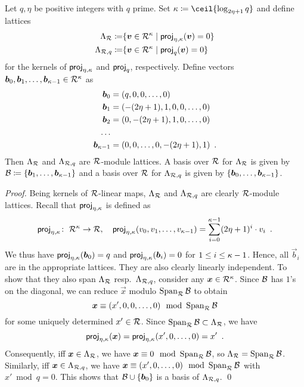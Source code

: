 \begin{proposition}\label{prop:kernellattices}
Let $q,\eta$ be positive integers with $q$ prime. Set $\limbs \coloneqq \ceil{ \log_{2\eta+1}q}$ and define lattices
\begin{align*}
\Lambda_{\mathcal{R}}    \coloneqq &\{\boldsymbol{v}\in\mathcal{R}^\kappa \mid \mathsf{proj}_{\eta,\kappa}(\boldsymbol{v}) = 0\}\\
\Lambda_{\mathcal{R},q} \coloneqq &\{\boldsymbol{v}\in\mathcal{R}^\kappa \mid \mathsf{proj}_{q}(\boldsymbol{v}) = 0\}\\
\end{align*}
for the kernels of $\mathsf{proj}_{\eta,\kappa}$ and $\mathsf{proj}_{q}$, respectively.
Define vectors $\boldsymbol{b}_0,\boldsymbol{b}_1,\ldots,\boldsymbol{b}_{\kappa-1} \in \mathcal{R}^\kappa$ as
\begin{align*}
\boldsymbol{b}_0 &= (q,0,0,\ldots, 0)\\
\boldsymbol{b}_1 &= (-(2\eta+1), 1, 0,0,\ldots, 0)\\
\boldsymbol{b}_2 &= (0, -(2\eta+1), 1, 0,\ldots, 0)\\
\ldots\\
\boldsymbol{b}_{\kappa-1}&=(0,0,\ldots,0, -(2\eta+1), 1)\enspace.
\end{align*}
Then $\Lambda_{\mathcal{R}}$ and $\Lambda_{\mathcal{R},q}$ are $\mathcal{R}$-module lattices. A basis over $\mathcal{R}$ for $\Lambda_{\mathcal{R}}$ is given by $\mathcal{B} \coloneqq \{\boldsymbol{b}_1,\ldots,\boldsymbol{b}_{\kappa-1}\}$ and
a basis over $\mathcal{R}$ for $\Lambda_{\mathcal{R},q}$ is given by $\{\boldsymbol{b}_0,\ldots,\boldsymbol{b}_{\kappa-1}\}$.
\end{proposition}
\begin{proof}
Being kernels of $\mathcal{R}$-linear maps, $\Lambda_{\mathcal{R}}$ and $\Lambda_{\mathcal{R},q}$ are clearly $\mathcal{R}$-module lattices. Recall that $\mathsf{proj}_{\eta,\kappa}$ is defined as
\[
\mathsf{proj}_{\eta,\kappa}\colon\;\mathcal{R}^\kappa\to\mathcal{R}, \quad \mathsf{proj}_{\eta,\kappa}(v_0,v_1,\ldots, v_{\kappa-1}) = \sum_{i=0}^{\kappa-1} (2\eta+1)^i \cdot v_i\enspace.
\]
We thus have $\mathsf{proj}_{\eta,\kappa}(\boldsymbol{b}_0) = q$ and $\mathsf{proj}_{\eta,\kappa}(\boldsymbol{b}_i) = 0$ for $1\leq i \leq \kappa-1$.
Hence, all $\vec{b}_i$ are in the appropriate lattices.
They are also clearly linearly independent.
To show that they also span $\Lambda_{\mathcal{R}}$ resp.\ $\Lambda_{\mathcal{R},q}$, consider any $\boldsymbol{x}\in\mathcal{R}^\kappa$.
Since $\mathcal{B}$ has $1$'s on the diagonal, we can reduce $\vec{x}$ modulo $\operatorname*{Span}_{\mathcal{R}} \mathcal{B}$ to obtain
\[
  \boldsymbol{x}\equiv (x',0,0,\ldots, 0) \mod {\operatorname*{Span}}\nolimits_{\mathcal{R}}\mathcal{B}
\]
for some uniquely determined $x'\in\mathcal{R}$.
Since $\operatorname*{Span}_{\mathcal{R}}\mathcal{B}\subset \Lambda_{\mathcal{R}}$, we have 
\[
 \mathsf{proj}_{\eta,\kappa}(\boldsymbol{x}) = \mathsf{proj}_{\eta,\kappa}(x',0,\ldots, 0) = x'\enspace. 
\]
Consequently, iff $\boldsymbol{x}\in\Lambda_{\mathcal{R}}$, we have $\boldsymbol{x}\equiv 0 \mod {\operatorname*{Span}}_{\mathcal{R}}\mathcal{B}$, so $\Lambda_{\mathcal{R}} = \operatorname*{Span}_{\mathcal{R}}\mathcal{B}$.
Similarly, iff $\boldsymbol{x}\in\Lambda_{\mathcal{R},q}$, we have $\boldsymbol{x}\equiv (x',0,\ldots, 0) \mod {\operatorname*{Span}}_{\mathcal{R}}\mathcal{B}$ with $x'\bmod q = 0$. This shows that $\mathcal{B}\cup\{\boldsymbol{b}_0\}$ is a basis of $\Lambda_{\mathcal{R},q}$.
\qed
\end{proof}
